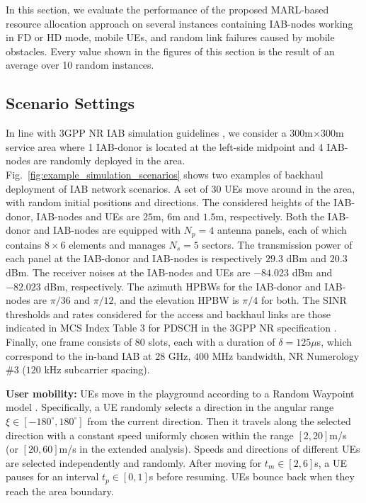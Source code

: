 In this section, we evaluate the performance of the proposed MARL-based resource allocation approach on several instances containing IAB-nodes working in FD or HD mode, mobile UEs, and random link failures caused by mobile obstacles. Every value shown in the figures of this section is the result of an average over 10 random instances.

\vspace{-11pt}
\subsection{Scenario Settings}
In line with 3GPP NR IAB simulation guidelines \cite{3gpp15study}, we consider a $300$m$\times300$m service area where 1 IAB-donor is located at the left-side midpoint and 4 IAB-nodes are randomly deployed in the area. Fig.~\ref{fig:example_simulation_scenarios} shows two examples of backhaul deployment of IAB network scenarios.
A set of 30 UEs move around in the area, with random initial positions and directions. The considered heights of the IAB-donor, IAB-nodes and UEs are $25$m, $6$m and $1.5$m, respectively.
Both the IAB-donor and IAB-nodes are equipped with $N_p=4$ antenna panels, each of which contains $8\times6$ elements and manages $N_s=5$ sectors.
The transmission power of each panel at the IAB-donor and IAB-nodes is respectively $29.3$ dBm and $20.3$ dBm. The receiver noises at the IAB-nodes and UEs are $-84.023$ dBm and $-82.023$ dBm, respectively. The azimuth HPBWs for the IAB-donor and IAB-nodes are $\pi/36$ and $\pi/12$, and the elevation HPBW is $\pi/4$ for both. The SINR thresholds and rates considered for the access and backhaul links are those indicated in MCS Index Table 3 for PDSCH in the 3GPP NR specification \cite{3gpp17PhysicalData}. Finally, one frame consists of $80$ slots, each with a duration of $\delta=125\mu$s, which correspond to the in-band IAB at $28$ GHz, $400$ MHz bandwidth, NR Numerology \#$3$ ($120$ kHz subcarrier spacing).

\textbf{User mobility:}
UEs move in the playground according to a Random Waypoint model \cite{bai2004survey}. Specifically, a UE randomly selects a direction in the angular range $\xi \in [-180^\circ, 180^\circ]$ from the current direction. Then it travels along the selected direction with a constant speed uniformly chosen within the range $[2, 20]$m/s (or $[20,60]$m/s in the extended analysis). Speeds and directions of different UEs are selected independently and randomly. After moving for $t_{m}\in [2, 6]$s, a UE pauses for an interval $t_{p}\in [0, 1]$s before resuming. UEs bounce back when they reach the area boundary.


